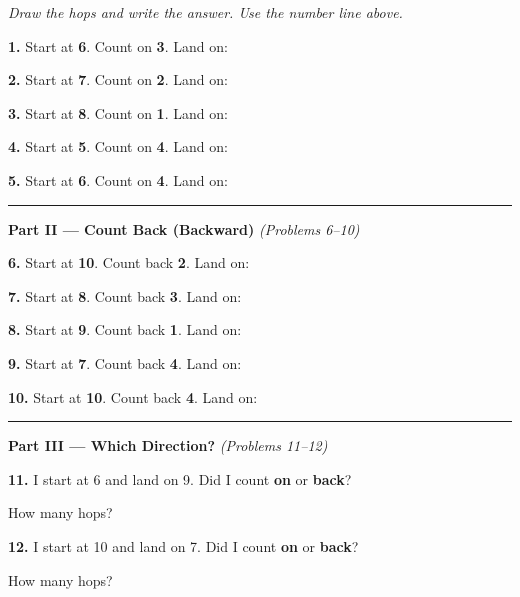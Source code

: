 \documentclass[12pt, letterpaper]{article}
\newcommand{\answerline}{\underline{\hspace{2.5cm}}}
\begin{document}
\medskip
\noindent\textit{Draw the hops and write the answer. Use the number line above.}

\bigskip
\noindent\textbf{1.} Start at \textbf{6}. Count on \textbf{3}. Land on: \hfill \answerline

\bigskip
\noindent\textbf{2.} Start at \textbf{7}. Count on \textbf{2}. Land on: \hfill \answerline

\bigskip
\noindent\textbf{3.} Start at \textbf{8}. Count on \textbf{1}. Land on: \hfill \answerline

\bigskip
\noindent\textbf{4.} Start at \textbf{5}. Count on \textbf{4}. Land on: \hfill \answerline

\bigskip
\noindent\textbf{5.} Start at \textbf{6}. Count on \textbf{4}. Land on: \hfill \answerline

\bigskip
\noindent\textcolor{scholared}{\rule{\linewidth}{0.4pt}}

\noindent\textcolor{scholared}{\large\textbf{Part II — Count Back (Backward)}} \hfill \textit{(Problems 6–10)}

\bigskip
\noindent\textbf{6.} Start at \textbf{10}. Count back \textbf{2}. Land on: \hfill \answerline

\bigskip
\noindent\textbf{7.} Start at \textbf{8}. Count back \textbf{3}. Land on: \hfill \answerline

\bigskip
\noindent\textbf{8.} Start at \textbf{9}. Count back \textbf{1}. Land on: \hfill \answerline

\bigskip
\noindent\textbf{9.} Start at \textbf{7}. Count back \textbf{4}. Land on: \hfill \answerline

\bigskip
\noindent\textbf{10.} Start at \textbf{10}. Count back \textbf{4}. Land on: \hfill \answerline

\bigskip
\noindent\textcolor{scholared}{\rule{\linewidth}{0.4pt}}

\noindent\textcolor{scholared}{\large\textbf{Part III — Which Direction?}} \hfill \textit{(Problems 11–12)}

\bigskip
\noindent\textbf{11.} I start at 6 and land on 9. Did I count \textbf{on} or \textbf{back}? \hfill \answerline

\bigskip
\noindent How many hops? \hfill \answerline

\bigskip
\noindent\textbf{12.} I start at 10 and land on 7. Did I count \textbf{on} or \textbf{back}? \hfill \answerline

\bigskip
\noindent How many hops? \hfill \answerline
\end{document}
